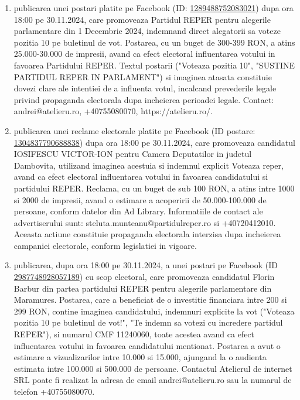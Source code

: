 \documentclass[a4paper,12pt]{article}
\begin{document}
\begin{enumerate}[leftmargin=*, label=\arabic*.)]
    \item publicarea unei postari platite pe Facebook (ID: \href{https://www.facebook.com/ads/library/?id=1289488752083021}{1289488752083021}) dupa ora 18:00 pe 30.11.2024, care promoveaza Partidul REPER pentru alegerile parlamentare din 1 Decembrie 2024, indemnand direct alegatorii sa voteze pozitia 10 pe buletinul de vot. Postarea, cu un buget de 300-399 RON, a atins 25.000-30.000 de impresii, avand ca efect electoral influentarea votului in favoarea Partidului REPER.  Textul postarii ("Voteaza pozitia 10", "SUSTINE PARTIDUL REPER IN PARLAMENT") si imaginea atasata constituie dovezi clare ale intentiei de a influenta votul, incalcand prevederile legale privind propaganda electorala dupa incheierea perioadei legale. Contact: andrei@atelieru.ro, +40755080070, https://atelieru.ro/.
    \item publicarea unei reclame electorale platite pe Facebook (ID postare: \href{https://www.facebook.com/ads/library/?id=1304837790688838}{1304837790688838}) dupa ora 18:00 pe 30.11.2024, care promoveaza candidatul IOSIFESCU VICTOR-ION pentru Camera Deputatilor in judetul Dambovita, utilizand imaginea acestuia si indemnul explicit Voteaza reper, avand ca efect electoral influentarea votului in favoarea candidatului si partidului REPER.  Reclama, cu un buget de sub 100 RON, a atins intre 1000 si 2000 de impresii, avand o estimare a acoperirii de 50.000-100.000 de persoane, conform datelor din Ad Library.  Informatiile de contact ale advertiserului sunt: steluta.munteanu@partidulreper.ro si +40720412010.  Aceasta actiune constituie propaganda electorala interzisa dupa incheierea campaniei electorale, conform legislatiei in vigoare.
    \item publicarea, dupa ora 18:00 pe 30.11.2024, a unei postari pe Facebook (ID \href{https://www.facebook.com/ads/library/?id=2987748928057189}{2987748928057189}) cu scop electoral, care promoveaza candidatul Florin Barbur din partea partidului REPER pentru alegerile parlamentare din Maramures. Postarea, care a beneficiat de o investitie financiara intre 200 si 299 RON, contine imaginea candidatului, indemnuri explicite la vot ("Voteaza pozitia 10 pe buletinul de vot!", "Te indemn sa votezi cu incredere partidul REPER"), si numarul CMF 11240060, toate acestea avand ca efect influentarea votului in favoarea candidatului mentionat.  Postarea a avut o estimare a vizualizarilor intre 10.000 si 15.000, ajungand la o audienta estimata intre 100.000 si 500.000 de persoane.  Contactul Atelierul de internet SRL poate fi realizat la adresa de email andrei@atelieru.ro sau la numarul de telefon +40755080070.

\end{enumerate}
\end{document}
